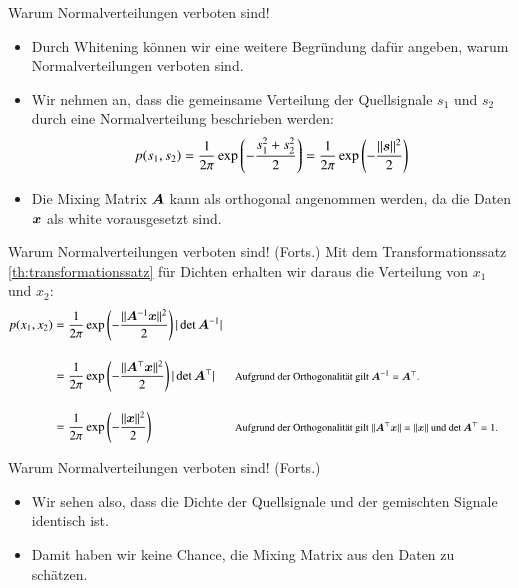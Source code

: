 \begin{frame}{Warum Normalverteilungen verboten sind!}{}
	\begin{itemize}
		\item Durch Whitening können wir eine weitere Begründung dafür angeben, warum Normalverteilungen verboten sind.
		\item Wir nehmen an, dass die gemeinsame Verteilung der Quellsignale $s_1$ und $s_2$
			durch eine Normalverteilung beschrieben werden:
		\begin{equation*}
			p(s_1, s_2)
				= \frac{1}{2 \pi} \exp\left( -\frac{s_1^2 + s_2^2}{2} \right)
				= \frac{1}{2 \pi} \exp\left( -\frac{\Vert \bm{s} \Vert^2}{2} \right)
		\end{equation*}
		\item Die Mixing Matrix $\bm{A}$ kann als orthogonal angenommen werden, da die Daten $\bm{x}$ als white vorausgesetzt sind.
	\end{itemize}
\end{frame}


\begin{frame}{Warum Normalverteilungen verboten sind! (Forts.)}{}
	Mit dem Transformationssatz \ref{th:transformationssatz} für Dichten erhalten wir daraus
	die Verteilung von $x_1$ und $x_2$:
	\begin{align*}
		p(x_1, x_2)
			&= \frac{1}{2 \pi} \exp\left( -\frac{\Vert \bm{A}^{-1} \bm{x} \Vert^2}{2} \right) \vert \det \bm{A}^{-1} \vert
	\\[4mm]
			&= \frac{1}{2 \pi} \exp\left( -\frac{\Vert \bm{A}^\top \bm{x} \Vert^2}{2} \right) \vert \det \bm{A}^\top \vert
			&& \footnotesize \text{Aufgrund der Orthogonalität gilt $\bm{A}^{-1} = \bm{A}^\top$.}
	\\[4mm]
			&= \frac{1}{2 \pi} \exp\left( -\frac{\Vert \bm{x} \Vert^2}{2} \right)
			&& \footnotesize \text{Aufgrund der Orthogonalität gilt $\Vert \bm{A}^\top \bm{x} \Vert = \Vert \bm{x} \Vert$ und $\det \bm{A}^\top = 1$.}
	\end{align*}
\end{frame}


\begin{frame}{Warum Normalverteilungen verboten sind! (Forts.)}{}
	\begin{itemize}
		\item Wir sehen also, dass die Dichte der Quellsignale und der gemischten Signale identisch ist.
		\item Damit haben wir keine Chance, die Mixing Matrix aus den Daten zu schätzen.
	\end{itemize}
\end{frame}



